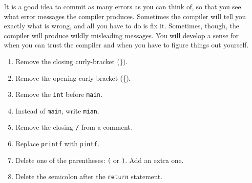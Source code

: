 \begin{exercise}

It is a good idea to commit as many errors as you can think of,
so that you see what error messages the compiler produces.
Sometimes the compiler will tell you exactly what is wrong, and all
you have to do is fix it.  Sometimes, though, the compiler will produce
wildly misleading messages.  You will develop a sense for when you can
trust the compiler and when you have to figure things out yourself.

\begin {enumerate}

\item Remove the closing curly-bracket (\}).

\item Remove the opening curly-bracket (\{).

\item Remove the {\tt int} before {\tt main}.

\item Instead of {\tt main}, write {\tt mian}.

\item Remove the closing {\tt */} from a comment.

\item Replace {\tt printf} with {\tt pintf}.

%

\item Delete one of the parentheses:  {\tt (} or  {\tt )}.  Add an extra one.

\item Delete the semicolon after the {\tt return} statement.

\end {enumerate}
\end{exercise}